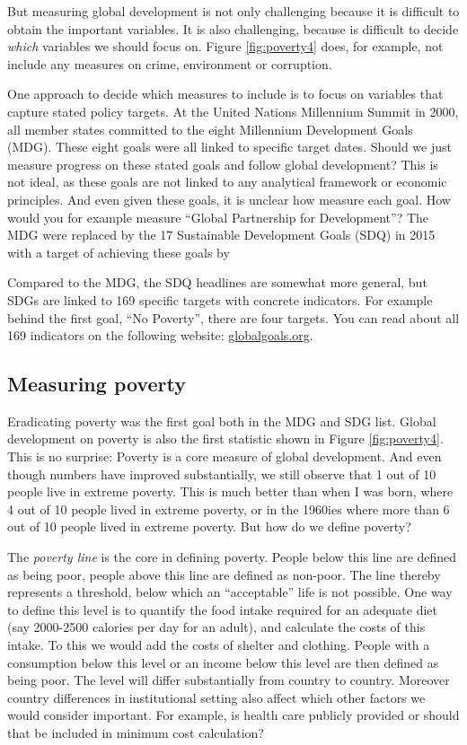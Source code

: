 \documentclass[]{book}
\begin{document}
But measuring global development is not only challenging because it is difficult to obtain the important variables. It is also challenging, because is difficult to decide \emph{which} variables we should focus on. Figure \ref{fig:poverty4} does, for example, not include any measures on crime, environment or corruption.

One approach to decide which measures to include is to focus on variables that capture stated policy targets. At the United Nations Millennium Summit in 2000, all member states committed to the eight Millennium Development Goals (MDG). These eight goals were all linked to specific target dates. Should we just measure progress on these stated goals and follow global development? This is not ideal, as these goals are not linked to any analytical framework or economic principles. And even given these goals, it is unclear how measure each goal. How would you for example measure ``Global Partnership for Development''? The MDG were replaced by the 17 Sustainable Development Goals (SDQ) in 2015 with a target of achieving these goals by

Compared to the MDG, the SDQ headlines are somewhat more general, but SDGs are linked to 169 specific targets with concrete indicators. For example behind the first goal, ``No Poverty'', there are four targets. You can read about all 169 indicators on the following website: \href{https://www.globalgoals.org}{globalgoals.org}.

\hypertarget{measuring-poverty}{%
\subsection{Measuring poverty}\label{measuring-poverty}}

Eradicating poverty was the first goal both in the MDG and SDG list. Global development on poverty is also the first statistic shown in Figure \ref{fig:poverty4}. This is no surprise: Poverty is a core measure of global development. And even though numbers have improved substantially, we still observe that 1 out of 10 people live in extreme poverty. This is much better than when I was born, where 4 out of 10 people lived in extreme poverty, or in the 1960ies where more than 6 out of 10 people lived in extreme poverty. But how do we define poverty?

The \emph{poverty line} is the core in defining poverty. People below this line are defined as being poor, people above this line are defined as non-poor. The line thereby represents a threshold, below which an ``acceptable'' life is not possible. One way to define this level is to quantify the food intake required for an adequate diet (say 2000-2500 calories per day for an adult), and calculate the costs of this intake. To this we would add the costs of shelter and clothing. People with a consumption below this level or an income below this level are then defined as being poor. The level will differ substantially from country to country. Moreover country differences in institutional setting also affect which other factors we would consider important. For example, is health care publicly provided or should that be included in minimum cost calculation?
\end{document}
